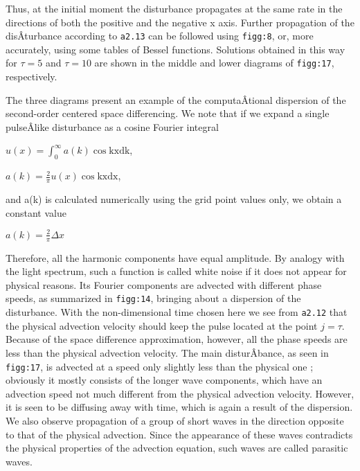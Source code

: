 Thus, at the initial moment the disturbance propagates at the same rate
in the directions of both the positive and the negative x axis. Further
propagation of the disÂ­turbance according to \texttt{a2.13} can be
followed using \texttt{figg:8}, or, more accurately, using some tables
of Bessel functions. Solutions obtained in this way for \(\tau = 5\) and
\(\tau = 10\) are shown in the middle and lower diagrams of
\texttt{figg:17}, respectively.

\begin{figure}
\centering
{}
\caption{}
\end{figure}

The three diagrams present an example of the computaÂ­tional dispersion
of the second-order centered space differencing. We note that if we
expand a single pulseÂ­like disturbance as a cosine Fourier integral

\(u\left( x \right) = \int_{0}^{\infty}{a\left( k \right)\cos\text{kxdk}}\),

\(a\left( k \right) = \frac{2}{\pi}u\left( x \right)\cos\text{kxdx}\),

and a(k) is calculated numerically using the grid point values only, we
obtain a constant value

\(a\left( k \right) = \frac{2}{\pi}\Delta x\)

Therefore, all the harmonic components have equal amplitude. By analogy
with the light spectrum, such a function is called white noise if it
does not appear for physical reasons. Its Fourier components are
advected with different phase speeds, as summarized in \texttt{figg:14},
bringing about a dispersion of the disturbance. With the non-dimensional
time chosen here we see from \texttt{a2.12} that the physical advection
velocity should keep the pulse located at the point \(j = \tau.\)
Because of the space difference approximation, however, all the phase
speeds are less than the physical advection velocity. The main
disturÂ­bance, as seen in \texttt{figg:17}, is advected at a speed only
slightly less than the physical one ; obviously it mostly consists of
the longer wave components, which have an advection speed not much
different from the physical advection velocity. However, it is seen to
be diffusing away with time, which is again a result of the dispersion.
We also observe propagation of a group of short waves in the direction
opposite to that of the physical advection. Since the appearance of
these waves contradicts the physical properties of the advection
equation, such waves are called parasitic waves.

